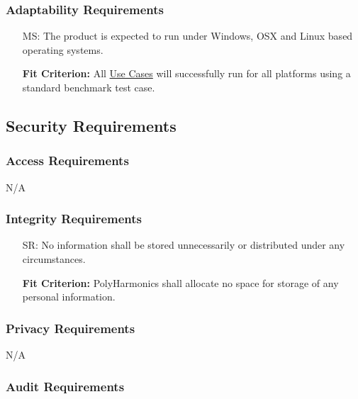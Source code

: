 \documentclass[12pt]{article}
\newcounter{masnum}
\newcounter{secunum}
\newcommand{\progname}{PolyHarmonics}
\begin{document}
\subsubsection{Adaptability Requirements}

\noindent \begin{itemize}
\item[MS\refstepcounter{masnum}\themasnum\label{NF_AR1}:] The product is
  expected to run under Windows, OSX and Linux based operating systems.


  \textbf{Fit Criterion:} All \hyperref[UseCase]{Use Cases} will successfully
   run for all platforms using a standard benchmark test case.
\end{itemize}

\subsection{Security Requirements}

\subsubsection{Access Requirements}

N/A


\subsubsection{Integrity Requirements}

\noindent \begin{itemize}
\item[SR\refstepcounter{secunum}\thesecunum\label{NF_sec2}:] No information
  shall be stored unnecessarily or distributed under any circumstances.

  \textbf{Fit Criterion:} \progname{} shall allocate no space for storage of any
  personal information.
\end{itemize}

\subsubsection{Privacy Requirements}

N/A

\subsubsection{Audit Requirements}
\end{document}
